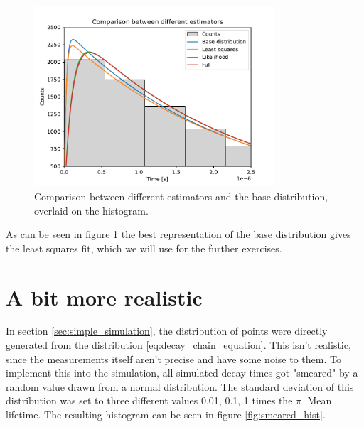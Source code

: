 \documentclass[11pt, a4paper, oneside]{book}
\newcommand\Plotwidth{0.8}
\newcommand{\pion}{$\pi^{-}$}
\begin{document}
\begin{figure}[h]
    \centering
    \includegraphics[width=\Plotwidth\textwidth]{images/comparison_estimators.pdf}
    \caption{Comparison between different estimators and the base distribution, overlaid on the histogram.}
    \label{fig:comparison_estimators}
\end{figure}

As can be seen in figure \ref{fig:comparison_estimators} the best representation of the base distribution gives the least squares fit, which we will use for the further exercises.

\section{A bit more realistic} \label{sec:realistic_simulation}

In section \ref{sec:simple_simulation}, the distribution of points were directly generated from the distribution \ref{eq:decay_chain_equation}. This isn't realistic, since the measurements itself aren't precise and have some noise to them. To implement this into the simulation, all simulated decay times got "smeared" by a random value drawn from a normal distribution. The standard deviation of this distribution was set to three different values 0.01, 0.1, 1 times the \pion Mean lifetime. The resulting histogram can be seen in figure \ref{fig:smeared_hist}.
\end{document}
